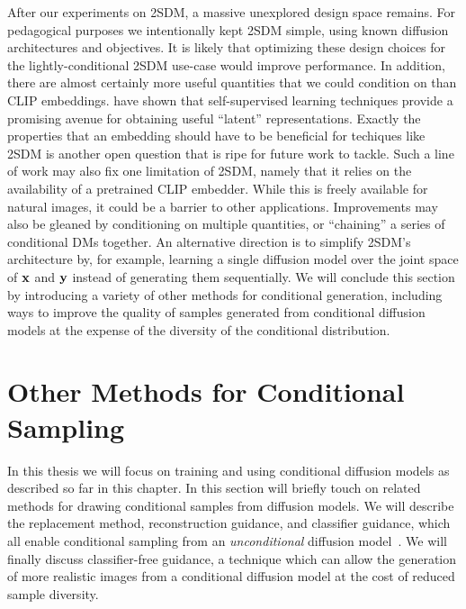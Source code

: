 After our experiments on 2SDM, a massive unexplored design space remains. For pedagogical purposes we intentionally kept 2SDM simple, using known diffusion architectures and objectives. It is likely that optimizing these design choices for the lightly-conditional 2SDM use-case would improve performance. In addition, there are almost certainly more useful quantities that we could condition on than CLIP embeddings. 
\citet{bao2022conditional,hu2022self} have shown that self-supervised learning techniques provide a promising avenue for obtaining useful ``latent'' representations. Exactly the properties that an embedding should have to be beneficial for techiques like 2SDM is another open question that is ripe for future work to tackle. Such a line of work may also fix one limitation of 2SDM, namely that it relies on the availability of a pretrained CLIP embedder. While this is freely available for natural images, it could be a barrier to other applications. Improvements may also be gleaned by conditioning on multiple quantities, or ``chaining'' a series of conditional DMs together. An alternative direction is to simplify 2SDM's architecture by, for example, learning a single diffusion model over the joint space of ${\mathbf{x}}$ and ${\mathbf{y}}$ instead of generating them sequentially. We will conclude this section by introducing a variety of other methods for conditional generation, including ways to improve the quality of samples generated from conditional diffusion models at the expense of the diversity of the conditional distribution.


\section{Other Methods for Conditional Sampling} \label{sec:other-methods-for-conditional-sampling}
In this thesis we will focus on training and using conditional diffusion models as described so far in this chapter. In this section will briefly touch on related methods for drawing conditional samples from diffusion models. We will describe the replacement method, reconstruction guidance, and classifier guidance, which all enable conditional sampling from an \textit{unconditional} diffusion model~\citep{song2020score,kadkhodaie2020solving,mittal2021symbolic,ho2022video}. We will finally discuss classifier-free guidance, a technique which can allow the generation of more realistic images from a conditional diffusion model at the cost of reduced sample diversity.

